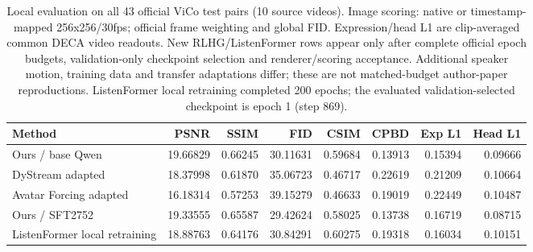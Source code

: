 \begin{table}[H]
\centering\small
\caption{Local evaluation on all 43 official ViCo test pairs (10 source videos). Image scoring: native or timestamp-mapped 256x256/30fps; official frame weighting and global FID. Expression/head L1 are clip-averaged common DECA video readouts. New RLHG/ListenFormer rows appear only after complete official epoch budgets, validation-only checkpoint selection and renderer/scoring acceptance. Additional speaker motion, training data and transfer adaptations differ; these are not matched-budget author-paper reproductions. ListenFormer local retraining completed 200 epochs; the evaluated validation-selected checkpoint is epoch 1 (step 869).}
\label{tab:vico-more-rgb}
\setlength{\tabcolsep}{4pt}
\begin{tabular}{lrrrrrrr}
\toprule
Method & PSNR & SSIM & FID & CSIM & CPBD & Exp L1 & Head L1 \\
\midrule
Ours / base Qwen & 19.66829 & 0.66245 & 30.11631 & 0.59684 & 0.13913 & 0.15394 & 0.09666 \\
DyStream adapted & 18.37998 & 0.61870 & 35.06723 & 0.46717 & 0.22619 & 0.21209 & 0.10664 \\
Avatar Forcing adapted & 16.18314 & 0.57253 & 39.15279 & 0.46633 & 0.19019 & 0.22449 & 0.10487 \\
Ours / SFT2752 & 19.33555 & 0.65587 & 29.42624 & 0.58025 & 0.13738 & 0.16719 & 0.08715 \\
ListenFormer local retraining & 18.88763 & 0.64176 & 30.84291 & 0.60275 & 0.19318 & 0.16034 & 0.10151 \\
\bottomrule
\end{tabular}
\end{table}
